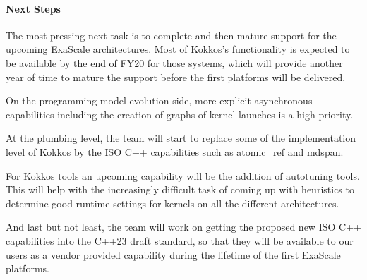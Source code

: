 \paragraph{Next Steps}

The most pressing next task is to complete and then mature support for the upcoming ExaScale architectures.
Most of Kokkos's functionality is expected to be available by the end of FY20 for those systems, which will provide another year of time to mature the support before the first platforms will be delivered.

On the programming model evolution side, more explicit asynchronous capabilities including the creation of graphs of kernel launches is a high priority.

At the plumbing level, the team will start to replace some of the implementation level of Kokkos by the ISO C++ capabilities such as atomic\_ref and mdspan.

For Kokkos tools an upcoming capability will be the addition of autotuning tools. This will help with the increasingly difficult task of coming up with heuristics to determine good runtime settings for kernels on all the different architectures.

And last but not least, the team will work on getting the proposed new ISO C++ capabilities into the C++23 draft standard, so that they will be available to our users as a vendor provided capability during the lifetime of the first ExaScale platforms.
